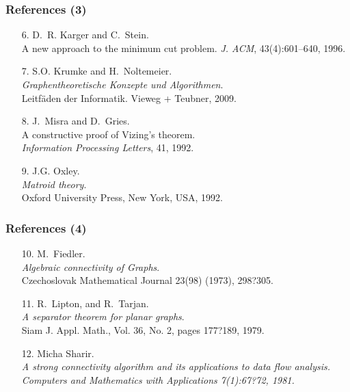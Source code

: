 \documentclass[titlepage,german,presentation]{beamer}
\begin{document}
\begin{frame}
\frametitle{References (3)}

\begin{itemize}
\item[6.]
D.~R. {Karger} and C.~{Stein}.\\
A new approach to the minimum cut problem.
{\em J. ACM}, 43(4):601--640, 1996.

\item[7.]
S.O. Krumke and H.~Noltemeier.\\
{\em Graphentheoretische Konzepte und Algorithmen}.\\
Leitf{\"a}den der Informatik. Vieweg + Teubner, 2009.

\item[8.]
J.~{Misra} and D.~{Gries}.\\
A constructive proof of Vizing’s theorem.\\
{\em Information Processing Letters}, 41, 1992. 

\item[9.]
J.G. {Oxley}.\\
{\em Matroid theory}.\\
Oxford University Press, New York, USA, 1992.
\end{itemize}

\end{frame}

\begin{frame}
\frametitle{References (4)}

\begin{itemize}

\item[10.]
M.~Fiedler.\\
{\em Algebraic connectivity of Graphs}.\\
 Czechoslovak Mathematical Journal 23(98) (1973), 298?305.

\item[11.]
R.~Lipton, and R.~Tarjan.\\
{\em A separator theorem for planar graphs}.\\
Siam J. Appl. Math., Vol. 36, No. 2, pages 177?189, 1979.

\item[12.]
Micha Sharir.\\
\em{ A strong connectivity algorithm and its applications to data flow analysis}.\\
Computers and Mathematics with Applications 7(1):67?72, 1981.
\end{itemize}

\end{frame}
\end{document}
